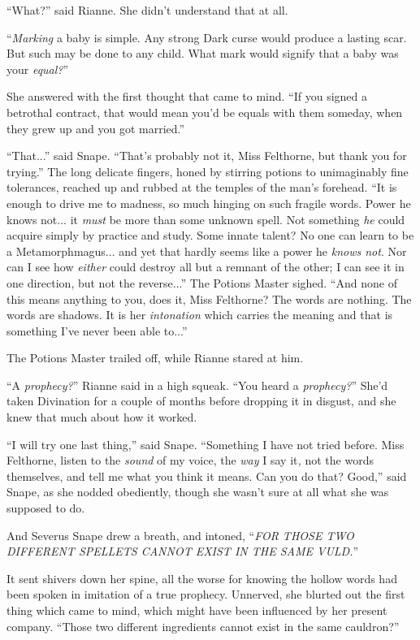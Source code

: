 ``What?'' said Rianne. She didn't understand that at all.

``\emph{Marking} a baby is simple. Any strong Dark curse would produce a lasting scar. But such may be done to any child. What mark would signify that a baby was your \emph{equal?}''

She answered with the first thought that came to mind. ``If you signed a betrothal contract, that would mean you'd be equals with them someday, when they grew up and you got married.''

``That...'' said Snape. ``That's probably not it, Miss Felthorne, but thank you for trying.'' The long delicate fingers, honed by stirring potions to unimaginably fine tolerances, reached up and rubbed at the temples of the man's forehead. ``It is enough to drive me to madness, so much hinging on such fragile words. Power he knows not... it \emph{must} be more than some unknown spell. Not something \emph{he} could acquire simply by practice and study. Some innate talent? No one can learn to be a Metamorphmagus... and yet that hardly seems like a power he \emph{knows not}. Nor can I see how \emph{either} could destroy all but a remnant of the other; I can see it in one direction, but not the reverse...'' The Potions Master sighed. ``And none of this means anything to you, does it, Miss Felthorne? The words are nothing. The words are shadows. It is her \emph{intonation} which carries the meaning and that is something I've never been able to...''

The Potions Master trailed off, while Rianne stared at him.

``A \emph{prophecy?}'' Rianne said in a high squeak. ``You heard a \emph{prophecy?}'' She'd taken Divination for a couple of months before dropping it in disgust, and she knew that much about how it worked.

``I will try one last thing,'' said Snape. ``Something I have not tried before. Miss Felthorne, listen to the \emph{sound} of my voice, the \emph{way} I say it\emph{,} not the words themselves, and tell me what you think it means. Can you do that? Good,'' said Snape, as she nodded obediently, though she wasn't sure at all what she was supposed to do.

And Severus Snape drew a breath, and intoned, ``\emph{FOR THOSE TWO DIFFERENT SPELLETS CANNOT EXIST IN THE SAME VULD.}''

It sent shivers down her spine, all the worse for knowing the hollow words had been spoken in imitation of a true prophecy. Unnerved, she blurted out the first thing which came to mind, which might have been influenced by her present company. ``Those two different ingredients cannot exist in the same cauldron?''

